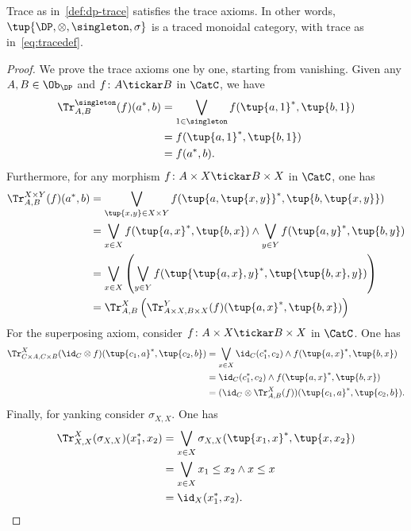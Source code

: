 {\begin{lemma}
Trace as in~\cref{def:dp-trace} satisfies the trace axioms. In other words, $\tup{\DP, \otimes, \singleton, \sigma}$ is a traced monoidal category, with trace as in~\cref{eq:tracedef}.
\end{lemma}
\begin{proof}
We prove the trace axioms one by one, starting from vanishing. Given any $A,B\in \Ob_\DP$ and $f\colon A\tickar B$ in $\CatC$, we have
\begin{equation}
    \begin{aligned}
        \Tr_{A,B}^{\singleton}(f)(a^*,b)&=\bigvee_{1\in \singleton}f(\tup{a,1}^*,\tup{b,1})\\
        &=f(\tup{a,1}^*,\tup{b,1})\\
        &=f(a^*,b).
    \end{aligned}
\end{equation}
Furthermore, for any morphism $f\colon A\times X \tickar B\times X$ in $\CatC$, one has
\begin{equation}
    \begin{aligned}
        \Tr_{A,B}^{X\times Y}(f)(a^*,b)&=\bigvee_{\tup{x,y} \in X\times Y} f(\tup{a,\tup{x,y}}^*,\tup{b,\tup{x,y}})\\
        &=\bigvee_{x \in X}f(\tup{a,x}^*,\tup{b,x})\wedge \bigvee_{y \in Y}f(\tup{a,y}^*,\tup{b,y})\\
        &=\bigvee_{x \in X}\left(\bigvee_{y \in Y} f(\tup{\tup{a,x},y}^*,\tup{\tup{b,x},y})\right)\\
        &=\Tr_{A,B}^X\left(
        \Tr_{A\times X,B\times X}^Y(f)(\tup{a,x}^*,\tup{b,x})\right)
    \end{aligned}
\end{equation}
For the superposing axiom, consider $f\colon A\times X\tickar B\times X$ in $\CatC$. One has
\begin{equation}
    \begin{aligned}
        \Tr_{C\times A,C\times B}^{X}(\id_C\otimes f)(\tup{c_1,a}^*,\tup{c_2,b})&=\bigvee_{x\in X} \id_C(c_1^*,c_2)\wedge f(\tup{a,x}^*,\tup{b,x})\\
        &=\id_C(c_1^*,c_2) \wedge f(\tup{a,x}^*,\tup{b,x})\\
        &=(\id_C \otimes \Tr_{A,B}^X(f))(\tup{c_1,a}^*,\tup{c_2,b}).
    \end{aligned}
\end{equation}
Finally, for yanking consider $\sigma_{X,X}$. One has
\begin{equation}
    \begin{aligned}
        \Tr_{X,X}^{X}(\sigma_{X,X})(x_1^*,x_2)&=\bigvee_{x\in X} \sigma_{X,X}(\tup{x_1,x}^*,\tup{x,x_2}) \\
        &=\bigvee_{x\in X} x_1\leq x_2 \wedge x\leq x\\
        &=\id_X(x_1^*,x_2).
    \end{aligned}
\end{equation}
\end{proof}}